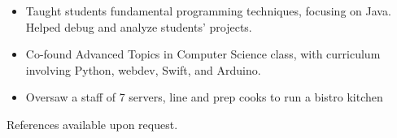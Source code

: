 \documentclass[11pt]{article}
\begin{document}
\vspace{1mm}
{\fontsize{10}{12}\robotocondlight
    \begin{itemize}[noitemsep,nolistsep]
        \item Taught students fundamental programming techniques, focusing on Java. Helped debug and analyze students’ projects. 
        \item Co-found Advanced Topics in Computer Science class, with curriculum involving Python, webdev, Swift, and Arduino. 
    \end{itemize}
    \begin{itemize}[noitemsep,nolistsep]
        \item Oversaw a staff of 7 servers, line and prep cooks to run a bistro kitchen
    \end{itemize}
    {\fontsize{8}{10}\robotocondlight References available upon request.}
}
\vspace{-5mm}
\hsep
\vspace{-3mm}
\end{document}
